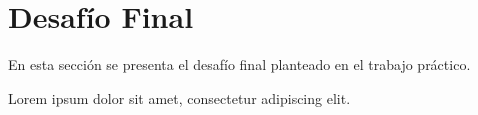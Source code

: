 \section{Desafío Final}

En esta sección se presenta el desafío final planteado en el trabajo práctico.

Lorem ipsum dolor sit amet, consectetur adipiscing elit.
